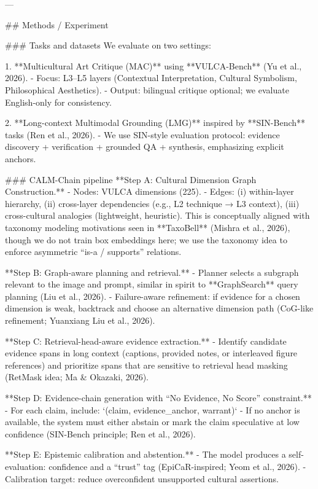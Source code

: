 ---

## Methods / Experiment

### Tasks and datasets
We evaluate on two settings:

1. **Multicultural Art Critique (MAC)** using **VULCA-Bench** (Yu et al., 2026).  
   - Focus: L3–L5 layers (Contextual Interpretation, Cultural Symbolism, Philosophical Aesthetics).
   - Output: bilingual critique optional; we evaluate English-only for consistency.

2. **Long-context Multimodal Grounding (LMG)** inspired by **SIN-Bench** tasks (Ren et al., 2026).  
   - We use SIN-style evaluation protocol: evidence discovery + verification + grounded QA + synthesis, emphasizing explicit anchors.

### CALM-Chain pipeline
**Step A: Cultural Dimension Graph Construction.**  
- Nodes: VULCA dimensions (225).  
- Edges: (i) within-layer hierarchy, (ii) cross-layer dependencies (e.g., L2 technique → L3 context), (iii) cross-cultural analogies (lightweight, heuristic).  
This is conceptually aligned with taxonomy modeling motivations seen in **TaxoBell** (Mishra et al., 2026), though we do not train box embeddings here; we use the taxonomy idea to enforce asymmetric “is-a / supports” relations.

**Step B: Graph-aware planning and retrieval.**  
- Planner selects a subgraph relevant to the image and prompt, similar in spirit to **GraphSearch** query planning (Liu et al., 2026).
- Failure-aware refinement: if evidence for a chosen dimension is weak, backtrack and choose an alternative dimension path (CoG-like refinement; Yuanxiang Liu et al., 2026).

**Step C: Retrieval-head-aware evidence extraction.**  
- Identify candidate evidence spans in long context (captions, provided notes, or interleaved figure references) and prioritize spans that are sensitive to retrieval head masking (RetMask idea; Ma & Okazaki, 2026).

**Step D: Evidence-chain generation with “No Evidence, No Score” constraint.**  
- For each claim, include:  
  `(claim, evidence_anchor, warrant)`  
- If no anchor is available, the system must either abstain or mark the claim speculative at low confidence (SIN-Bench principle; Ren et al., 2026).

**Step E: Epistemic calibration and abstention.**  
- The model produces a self-evaluation: confidence and a “trust” tag (EpiCaR-inspired; Yeom et al., 2026).  
- Calibration target: reduce overconfident unsupported cultural assertions.

